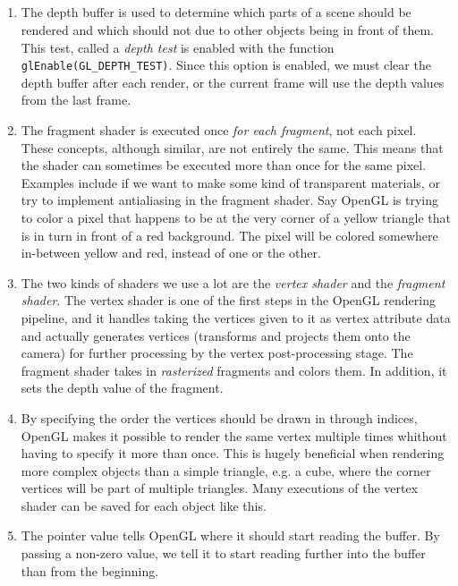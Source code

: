 \documentclass[]{article}
\begin{document}
\begin{multicols}{2}
\subsection{}
\begin{enumerate}
\item The depth buffer is used to determine which parts of a scene should be rendered and which should not due to other objects being in front of them. This test, called a \textit{depth test} is enabled with the function \texttt{glEnable(GL\_DEPTH\_TEST)}. Since this option is enabled, we must clear the depth buffer after each render, or the current frame will use the depth values from the last frame.
\item The fragment shader is executed once \textit{for each fragment}, not each pixel. These concepts, although similar, are not entirely the same. This means that the shader can sometimes be executed more than once for the same pixel. Examples include if we want to make some kind of transparent materials, or try to implement antialiasing in the fragment shader. Say OpenGL is trying to color a pixel that happens to be at the very corner of a yellow triangle that is in turn in front of a red background. The pixel will be colored somewhere in-between yellow and red, instead of one or the other.
\item The two kinds of shaders we use a lot are the \textit{vertex shader} and the \textit{fragment shader}. The vertex shader is one of the first steps in the OpenGL rendering pipeline, and it handles taking the vertices given to it as vertex attribute data and actually generates vertices (transforms and projects them onto the camera) for further processing by the vertex post-processing stage. The fragment shader takes in \textit{rasterized} fragments and colors them. In addition, it sets the depth value of the fragment.
\item By specifying the order the vertices should be drawn in through indices, OpenGL makes it possible to render the same vertex multiple times whithout having to specify it more than once. This is hugely beneficial when rendering more complex objects than a simple triangle, e.g. a cube, where the corner vertices will be part of multiple triangles. Many executions of the vertex shader can be saved for each object like this.
\item The pointer value tells OpenGL where it should start reading the buffer. By passing a non-zero value, we tell it to start reading further into the buffer than from the beginning.
\end{enumerate}

\end{multicols}
\end{document}
